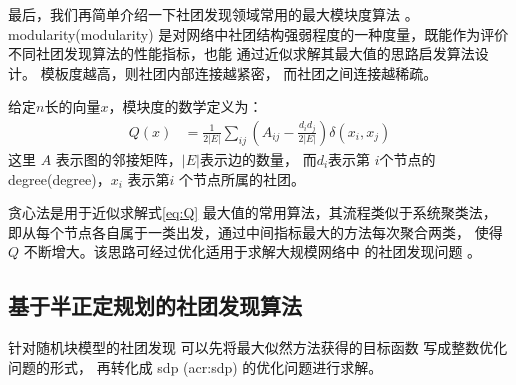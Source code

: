 最后，我们再简单介绍一下社团发现领域常用的最大模块度算法
\cite{newman2006modularity}。
\gls{modularity}(\glsdesc{modularity})
是对网络中社团结构强弱程度的一种度量，既能作为评价
不同社团发现算法的性能指标，也能
通过近似求解其最大值的思路启发算法设计。
模板度越高，则社团内部连接越紧密，
而社团之间连接越稀疏。

给定$n$长的向量$x$，模块度的数学定义为：
\begin{align}\label{eq:Q}
  Q(x) &= \frac{1}{2 |E|} \sum_{ij} (A_{ij} - \frac{d_i d_j}{2 |E|}) \delta(x_i, x_j)
\end{align}
这里 $A$ 表示图的邻接矩阵，$|E|$表示边的数量，
而$d_i$表示第
$i$个节点的\gls{degree}(\glsdesc{degree})，$x_i$ 表示第$i$
个节点所属的社团。

贪心法是用于近似求解式\eqref{eq:Q}
最大值的常用算法，其流程类似于系统聚类法，
即从每个节点各自属于一类出发，通过中间指标最大的方法每次聚合两类，
使得 $Q$ 不断增大。该思路可经过优化适用于求解大规模网络中
的社团发现问题 \cite{clauset2004finding}。

\subsection{基于半正定规划的社团发现算法}

针对随机块模型的社团发现
可以先将最大似然方法获得的目标函数
写成整数优化问题的形式，
再转化成 \gls{sdp} (\gls{acr:sdp}) 的优化问题进行求解。


